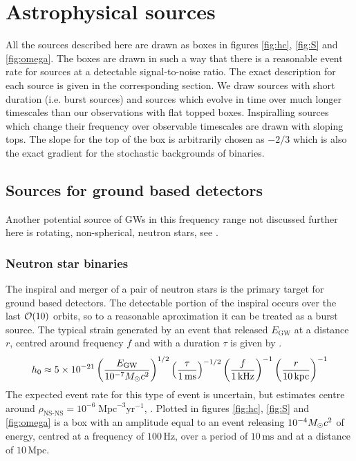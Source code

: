 \section{Astrophysical sources}\label{sec:sources}
All the sources described here are drawn as boxes in figures \ref{fig:hc}, \ref{fig:S} and \ref{fig:omega}. The boxes are drawn in such a way that there is a reasonable event rate for sources at a detectable signal-to-noise ratio. The exact description for each source is given in the corresponding section. We draw sources with short duration (i.e. burst sources) and sources which evolve in time over much longer timescales than our observations with flat topped boxes. Inspiralling sources which change their frequency over observable timescales are drawn with sloping tops. The slope for the top of the box is arbitrarily chosen as $-2/3$ which is also the exact gradient for the stochastic backgrounds of binaries. 




\subsection{Sources for ground based detectors}
Another potential source of GWs in this frequency range not discussed further here is rotating, non-spherical, neutron stars, see \cite{2013ASPC..467...59S}.

\subsubsection{Neutron star binaries}
The inspiral and merger of a pair of neutron stars is the primary target for ground based detectors. The detectable portion of the inspiral occurs over the last ${\cal{O}}(10)$ orbits, so to a reasonable aproximation it can be treated as a burst source. The typical strain generated by an event that released $E_{\textrm{GW}}$ at a distance $r$, centred around frequency $f$ and with a duration $\tau$ is given by \cite{2013ASPC..467...59S}.
\begin{equation} h_{0}\approx 5\times 10^{-21}\left(\frac{E_{\textrm{GW}}}{10^{-7}M_{ \odot } c^{2}}\right)^{1/2}\left( \frac{\tau}{1\,\textrm{ms}} \right)^{-1/2}\left( \frac{f}{1\,\textrm{kHz}} \right)^{-1}\left( \frac{r}{10\,\textrm{kpc}} \right)^{-1} \end{equation}
The expected event rate for this type of event is uncertain, but estimates centre around $\rho_{\textrm{NS-NS}}=10^{-6}\;\textrm{Mpc}^{-3}\textrm{yr}^{-1}$, \cite{2011PrPNP..66..239A}. Plotted in figures \ref{fig:hc}, \ref{fig:S} and \ref{fig:omega} is a box with an amplitude equal to an event releasing $10^{-4}M_{ \odot } c^{2}$ of energy, centred at a frequency of $100\,\textrm{Hz}$, over a period of $10\,\textrm{ms}$ and at a distance of $10\,\textrm{Mpc}$.

